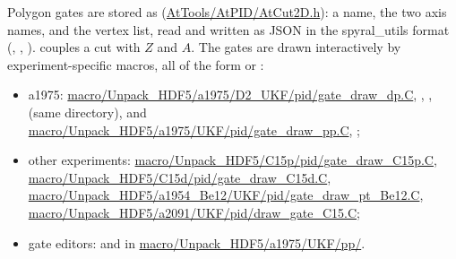 Polygon gates are stored as  (\url{AtTools/AtPID/AtCut2D.h}): a name,
the two axis names, and the vertex list, read and written as JSON in the spyral\_utils
 format (, , ).
 couples a cut with $Z$ and $A$. The gates are drawn interactively by
experiment-specific macros, all of the form  or :
\begin{itemize}
  \item a1975: \url{macro/Unpack_HDF5/a1975/D2_UKF/pid/gate_draw_dp.C},
        , ,  (same
        directory), and \url{macro/Unpack_HDF5/a1975/UKF/pid/gate_draw_pp.C},
        ;
  \item other experiments: \url{macro/Unpack_HDF5/C15p/pid/gate_draw_C15p.C},
        \url{macro/Unpack_HDF5/C15d/pid/gate_draw_C15d.C},
        \url{macro/Unpack_HDF5/a1954_Be12/UKF/pid/gate_draw_pt_Be12.C},
        \url{macro/Unpack_HDF5/a2091/UKF/pid/draw_gate_C15.C};
  \item gate editors:  and  in
        \url{macro/Unpack_HDF5/a1975/UKF/pp/}.
\end{itemize}

